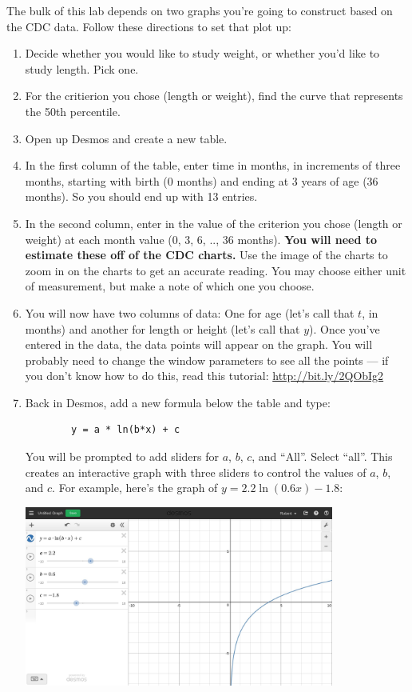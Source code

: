 \documentclass[11pt,letterpaper]{article}
\begin{document}
The bulk of this lab depends on two graphs you're going to construct based on the CDC data. Follow these directions to set that plot up: 

\begin{enumerate}
	\item Decide whether you would like to study weight, or whether you'd like to study length. Pick one. 
	\item For the critierion you chose (length or weight), find the curve that represents the 50th percentile. 
	\item Open up Desmos and create a new table. 
	\item In the first column of the table, enter time in months, in increments of three months, starting with birth (0 months) and ending at 3 years of age (36 months). So you should end up with 13 entries. 
	\item In the second column, enter in the value of the criterion you chose (length or weight) at each month value (0, 3, 6, .., 36 months). \textbf{You will need to estimate these off of the CDC charts.} Use the image of the charts to zoom in on the charts to get an accurate reading. You may choose either unit of measurement, but make a note of which one you choose. 
	\item You will now have two columns of data: One for age (let's call that $t$, in months) and another for length or height (let's call that $y$). Once you've entered in the data, the data points will appear on the graph. You will probably need to change the window parameters to see all the points --- if you don't know how to do this, read this tutorial: \url{http://bit.ly/2QObIg2}
	\item Back in Desmos, add a new formula below the table and type: 
	\begin{verbatim}
	    y = a * ln(b*x) + c
	\end{verbatim}
	You will be prompted to add sliders for $a$, $b$, $c$, and ``All''. Select ``all''. This creates an interactive graph with three sliders to control the values of $a$, $b$, and $c$. For example, here's the graph of $y = 2.2 \ln(0.6x) - 1.8$: 
	\begin{center}
	    \includegraphics[width=4in]{desmos-lab5.jpg}

\end{center}
\end{enumerate}
\end{document}
